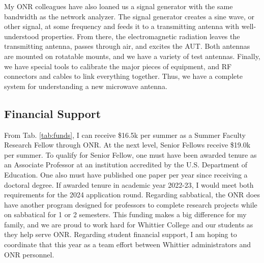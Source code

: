 \documentclass[../../../main.tex]{subfiles}
\begin{document}
My ONR colleagues have also loaned us a signal generator with the same bandwidth as the network analyzer.  The signal generator creates a sine wave, or other signal, at some frequency and feeds it to a transmitting antenna with well-understood properties.  From there, the electromagnetic radiation leaves the transmitting antenna, passes through air, and excites the AUT.  Both antennas are mounted on rotatable mounts, and we have a variety of test antennas.  Finally, we have special tools to calibrate the major pieces of equipment, and RF connectors and cables to link everything together.  Thus, we have a complete system for understanding a new microwave antenna.

\subsection{Financial Support}

From Tab. \ref{tab:funds}, I can receive \$16.5k per summer as a Summer Faculty Research Fellow through ONR.  At the next level, Senior Fellows receive \$19.0k per summer.  To qualify for Senior Fellow, one must have been awarded tenure as an Associate Professor at an institution accredited by the U.S. Department of Education.  One also must have published one paper per year since receiving a doctoral degree.  If awarded tenure in academic year 2022-23, I would meet both requirements for the 2024 application round.  Regarding sabbatical, the ONR does have another program designed for professors to complete research projects while on sabbatical for 1 or 2 semesters.  This funding makes a big difference for my family, and we are proud to work hard for Whittier College and our students as they help serve ONR.  Regarding student financial support, I am hoping to coordinate that this year as a team effort between Whittier administrators and ONR personnel.
\end{document}
